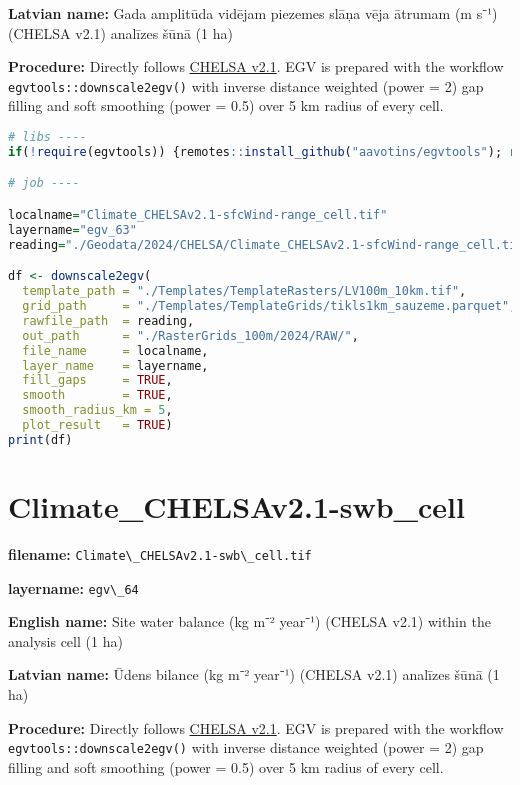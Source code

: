 \documentclass[
]{book}
\newcommand{\passthrough}[1]{#1}
\begin{document}
\textbf{Latvian name:} Gada amplitūda vidējam piezemes slāņa vēja ātrumam (m s⁻¹) (CHELSA v2.1) analīzes šūnā (1 ha)

\textbf{Procedure:} Directly follows \hyperref[Ch04.11]{CHELSA v2.1}. EGV is prepared with the
workflow \passthrough{\lstinline!egvtools::downscale2egv()!} with inverse distance weighted (power = 2)
gap filling and soft smoothing (power = 0.5) over 5 km radius of every cell.

\begin{lstlisting}[language=R]
# libs ----
if(!require(egvtools)) {remotes::install_github("aavotins/egvtools"); require(egvtools)}

# job ----

localname="Climate_CHELSAv2.1-sfcWind-range_cell.tif"
layername="egv_63"
reading="./Geodata/2024/CHELSA/Climate_CHELSAv2.1-sfcWind-range_cell.tif"

df <- downscale2egv(
  template_path = "./Templates/TemplateRasters/LV100m_10km.tif",
  grid_path     = "./Templates/TemplateGrids/tikls1km_sauzeme.parquet",
  rawfile_path  = reading,
  out_path      = "./RasterGrids_100m/2024/RAW/",
  file_name     = localname,
  layer_name    = layername,
  fill_gaps     = TRUE,
  smooth        = TRUE,
  smooth_radius_km = 5,
  plot_result   = TRUE)
print(df)
\end{lstlisting}

\section{Climate\_CHELSAv2.1-swb\_cell}\label{ch06.064}

\textbf{filename:} \passthrough{\lstinline!Climate\_CHELSAv2.1-swb\_cell.tif!}

\textbf{layername:} \passthrough{\lstinline!egv\_64!}

\textbf{English name:} Site water balance (kg m⁻² year⁻¹) (CHELSA v2.1) within the analysis cell (1 ha)

\textbf{Latvian name:} Ūdens bilance (kg m⁻² year⁻¹) (CHELSA v2.1) analīzes šūnā (1 ha)

\textbf{Procedure:} Directly follows \hyperref[Ch04.11]{CHELSA v2.1}. EGV is prepared with the
workflow \passthrough{\lstinline!egvtools::downscale2egv()!} with inverse distance weighted (power = 2)
gap filling and soft smoothing (power = 0.5) over 5 km radius of every cell.
\end{document}
